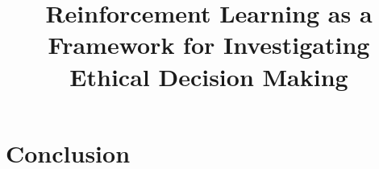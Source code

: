 \documentclass[11pt]{amsart}
\title{Reinforcement Learning as a Framework for Investigating Ethical Decision Making}
\author{}
\date{}                                           %
\begin{document}
\maketitle

\begin{abstract}

\end{abstract}


\newpage
\section{Conclusion}




\newpage

\end{document}
